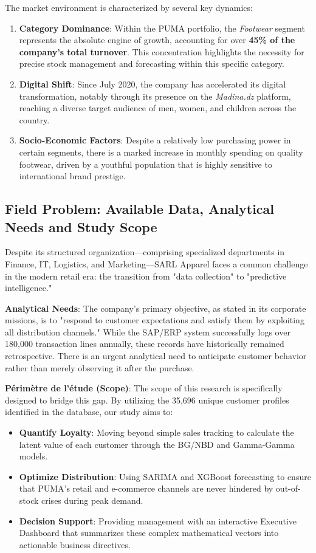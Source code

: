 \documentclass[12pt,a4paper]{report}
\begin{document}
The market environment is characterized by several key dynamics:
\begin{enumerate}
    \item \textbf{Category Dominance}: Within the PUMA portfolio, the \textit{Footwear} segment represents the absolute engine of growth, accounting for over \textbf{45\% of the company's total turnover}. This concentration highlights the necessity for precise stock management and forecasting within this specific category.
    \item \textbf{Digital Shift}: Since July 2020, the company has accelerated its digital transformation, notably through its presence on the \textit{Madina.dz} platform, reaching a diverse target audience of men, women, and children across the country.
    \item \textbf{Socio-Economic Factors}: Despite a relatively low purchasing power in certain segments, there is a marked increase in monthly spending on quality footwear, driven by a youthful population that is highly sensitive to international brand prestige.
\end{enumerate}

\subsection{Field Problem: Available Data, Analytical Needs and Study Scope}
Despite its structured organization—comprising specialized departments in Finance, IT, Logistics, and Marketing—SARL Apparel faces a common challenge in the modern retail era: the transition from "data collection" to "predictive intelligence."

\textbf{Analytical Needs}: The company’s primary objective, as stated in its corporate missions, is to "respond to customer expectations and satisfy them by exploiting all distribution channels." While the SAP/ERP system successfully logs over 180,000 transaction lines annually, these records have historically remained retrospective. There is an urgent analytical need to anticipate customer behavior rather than merely observing it after the purchase.

\textbf{Périmètre de l'étude (Scope)}:
The scope of this research is specifically designed to bridge this gap. By utilizing the 35,696 unique customer profiles identified in the database, our study aims to:
\begin{itemize}
    \item \textbf{Quantify Loyalty}: Moving beyond simple sales tracking to calculate the latent value of each customer through the BG/NBD and Gamma-Gamma models.
    \item \textbf{Optimize Distribution}: Using SARIMA and XGBoost forecasting to ensure that PUMA's retail and e-commerce channels are never hindered by out-of-stock crises during peak demand.
    \item \textbf{Decision Support}: Providing management with an interactive Executive Dashboard that summarizes these complex mathematical vectors into actionable business directives.
\end{itemize}
\end{document}

